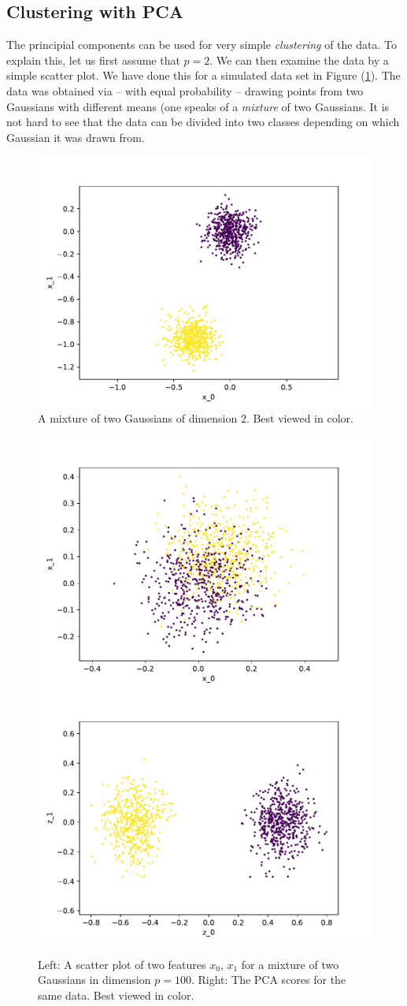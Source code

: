 \documentclass{article}
\begin{document}
\subsection{Clustering with PCA} The principial components can be used for very simple \emph{clustering} of the data. To explain this, let us first assume that $p=2$. We can then examine the data by a simple scatter plot. We have done this for a simulated data set in Figure (\ref{fig:clusters1}). The data was  obtained via -- with equal probability -- drawing points from two Gaussians with different means (one speaks of a \emph{mixture} of two Gaussians. It is not hard to see that the data can be divided into two classes depending on which Gaussian it was drawn from.

\begin{figure}
    \centering
    \includegraphics[width=0.5\linewidth]{graphics/2_feature_clusters.pdf} 
    \caption{A mixture of two Gaussians of dimension $2$. Best viewed in color.}
    \label{fig:clusters1}
\end{figure}

\begin{figure}
    \centering
    \includegraphics[width=.45\linewidth]{graphics/100_feature_clusters.pdf}\includegraphics[width=.45\linewidth]{graphics/100_feature_clusters_pca.pdf}
    \caption{Left: A scatter plot of two features $x_0$, $x_1$ for a mixture of two Gaussians in dimension $p=100$. Right: The PCA scores for the same data. Best viewed in color.}
    \label{fig:clusters}
\end{figure}
\end{document}
